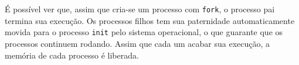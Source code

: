 \documentclass{amsart}
\theoremstyle{plain}
\begin{document}
\begin{figure}[h]
\end{figure}

É possível ver que, assim que cria-se um processo com \lstinline{fork}, o processo pai termina sua
execução. Os processos filhos tem sua paternidade automaticamente movida para o processo
\lstinline{init} pelo sistema operacional, o que guarante que os processos continuem rodando. Assim
que cada um acabar sua execução, a memória de cada processo é liberada.
\end{document}
